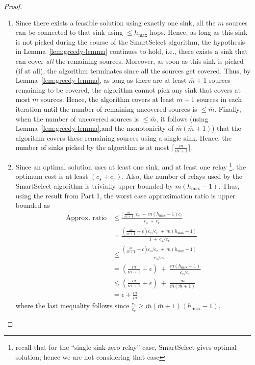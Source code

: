 \documentclass[conference]{IEEEtran}
\newcommand{\mbar}{\overline{m}}
\begin{document}
\begin{proof}
\begin{enumerate}
\item Since there exists a feasible solution using exactly one sink, all the $m$ sources can be connected to that sink using $\leq h_{\max}$ hops. Hence, as long as this sink is not picked during the course of the SmartSelect algorithm, the hypothesis in Lemma~\ref{lem:greedy-lemma} continues to hold, i.e., there exists a sink that can cover \emph{all} the remaining sources. Moreover, as soon as this sink is picked (if at all), the algorithm terminates since all the sources get covered. Thus, by Lemma~\ref{lem:greedy-lemma}, as long as there are at least $\mbar+1$ sources remaining to be covered, the algorithm cannot pick any sink that covers at most $\mbar$ sources. Hence, the algorithm covers at least $\mbar + 1$ sources in each iteration until the number of remaining uncovered sources is $\leq \mbar$. Finally, when the number of uncovered sources is $\leq \mbar$, it follows (using Lemma~\ref{lem:greedy-lemma},and the monotonicity of $\mbar(\mbar + 1)$) that the algorithm covers these remaining sources using a single sink. Hence, the number of sinks picked by the algorithm is at most $\lceil\frac{m}{\mbar + 1}\rceil$.
\item Since an optimal solution uses at least one sink, and at least one relay \footnote{recall that for the ``single sink-zero relay'' case, SmartSelect gives optimal solution; hence we are not considering that case}, the optimum cost is at least $(c_s + c_r)$. Also, the number of relays used by the SmartSelect algorithm is trivially upper bounded by $m(h_{\max}-1)$. Thus, using the result from Part 1, the worst case approximation ratio is upper bounded as
\begin{align}
\text{Approx. ratio}&\leq\frac{\lceil\frac{m}{\mbar+1}\rceil c_s\:+\:m(h_{\max}-1)c_r}{c_s\:+\:c_r}\nonumber\\
&= \frac{(\frac{m}{\mbar + 1}+\epsilon) c_s/c_r\:+\:m(h_{\max}-1)}{1\:+\:c_s/c_r}\nonumber\\
&\leq \frac{(\frac{m}{\mbar + 1}+\epsilon)c_s/c_r\:+\:m(h_{\max}-1)}{c_s/c_r}\nonumber\\
&= (\frac{m}{\mbar + 1}+\epsilon)\:+\:\frac{m(h_{\max}-1)}{c_s/c_r}\nonumber\\
&\leq (\frac{m}{\mbar + 1}+\epsilon)\:+\:\frac{m}{\mbar(\mbar + 1)}\nonumber\\
&= \epsilon + \frac{m}{\mbar}\nonumber
\end{align}
where the last inequality follows since $\frac{c_s}{c_r}\geq \mbar(\mbar+1)(h_{\max}-1)$. 
\end{enumerate} 
\end{proof}
\end{document}
